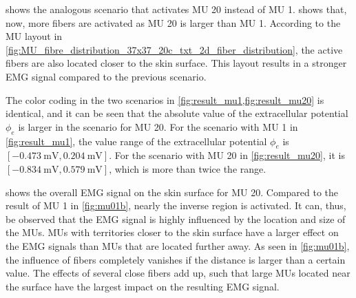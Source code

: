  shows the analogous scenario that activates MU 20 instead of MU 1.  shows that, now, more fibers are activated as MU 20 is larger than MU 1. According to the MU layout in \cref{fig:MU_fibre_distribution_37x37_20c_txt_2d_fiber_distribution}, the active fibers are also located closer to the skin surface. This layout results in a stronger EMG signal compared to the previous scenario. 

The color coding in the two scenarios in \cref{fig:result_mu1,fig:result_mu20} is identical, and it can be seen that the absolute value of the extracellular potential $\phi_e$ is larger in the scenario for MU 20. For the scenario with MU 1 in \cref{fig:result_mu1}, the value range of the extracellular potential $\phi_e$ is $[\SI{-0.473}{\milli\volt}, \SI{0.204}{\milli\volt}]$. For the scenario with MU 20 in \cref{fig:result_mu20}, it is $[\SI{-0.834}{\milli\volt}, \SI{0.579}{\milli\volt}]$, which is more than twice the range.

 shows the overall EMG signal on the skin surface for MU 20. Compared to the result of MU 1 in \cref{fig:mu01b}, nearly the inverse region is activated. It can, thus, be observed that the EMG signal is highly influenced by the location and size of the MUs. MUs with territories closer to the skin surface have a larger effect on the EMG signals than MUs that are located further away. As seen in \cref{fig:mu01b}, the influence of fibers completely vanishes if the distance is larger than a certain value. The effects of several close fibers add up, such that large MUs located near the surface have the largest impact on the resulting EMG signal.

